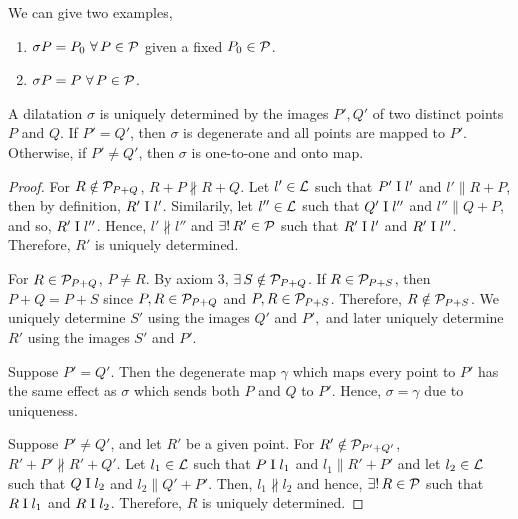 \noindent
We can give two examples,
\begin{enumerate}[label=\roman*.]
    \item $\sigma P=P_0\ \forall\, P \in \mathcal{P}$ given a fixed $P_0 \in \mathcal{P}$.
    \item $\sigma P=P\ \forall\, P \in \mathcal{P}$.
\end{enumerate}

\begin{theorem}
    A dilatation $\sigma$ is uniquely determined by the images $P', Q'$ of two distinct points $P$ and $Q$. If $P'=Q'$, then $\sigma$ is degenerate and all points are mapped to $P'$. Otherwise, if $P' \neq Q'$, then $\sigma$ is one-to-one and onto map.
\end{theorem}
\begin{proof}
    For $R \notin \mathcal{P}_{P+Q}$, $R+P \nparallel R+Q$. Let $l' \in \mathcal{L}$ such that $P' \mathrel\text{I} l'$ and $l' \parallel R+P$, then by definition, $R' \mathrel\text{I} l'$. Similarily, let $l'' \in \mathcal{L}$ such that $Q' \mathrel\text{I} l''$ and $l'' \parallel Q+P$, and so, $R' \mathrel\text{I} l''$. Hence, $l' \nparallel l''$ and $\exists!\, R' \in \mathcal{P}$ such that $R' \mathrel\text{I} l'$ and $R' \mathrel\text{I} l''$. Therefore, $R'$ is uniquely determined.

    \vspace{1ex}

    \noindent
    For $R \in \mathcal{P}_{P+Q}$, $P \neq R$. By axiom 3, $\exists\, S \notin \mathcal{P}_{P+Q}$. If $R \in \mathcal{P}_{P+S}$, then $P+Q=P+S$ since $P,R \in \mathcal{P}_{P+Q}$ and $P,R \in \mathcal{P}_{P+S}$. Therefore, $R \notin \mathcal{P}_{P+S}$. We uniquely determine $S'$ using the images $Q'$ and $P',$ and later uniquely determine $R'$ using the images $S'$ and $P'.$

    \vspace{1ex}

    Suppose $P' = Q'$. Then the degenerate map $\gamma$ which maps every point to $P'$ has the same effect as $\sigma$ which sends both $P$ and $Q$ to $P'$. Hence, $\sigma = \gamma$ due to uniqueness.

    \vspace{1ex}

    \noindent
    Suppose $P' \neq Q'$, and let $R'$ be a given point. For $R' \notin \mathcal{P}_{P'+Q'}$, $R'+P' \nparallel R'+Q'$. Let $l_1 \in \mathcal{L}$ such that $P \mathrel\text{I} l_1$ and $l_1 \parallel R'+P'$ and let $l_2 \in \mathcal{L}$ such that $Q \mathrel\text{I} l_2$ and $l_2 \parallel Q'+P'$. Then, $l_1 \nparallel l_2$ and hence, $\exists!\,R \in \mathcal{P}$ such that $R \mathrel\text{I} l_1$ and $R \mathrel\text{I} l_2$. Therefore, $R$ is uniquely determined.


\end{proof}
